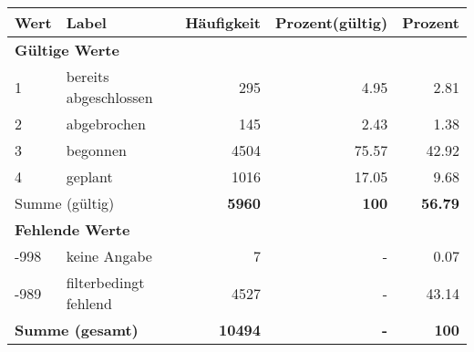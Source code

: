      \begin{longtable}{lXrrr}
     \toprule
     \textbf{Wert} & \textbf{Label} & \textbf{Häufigkeit} & \textbf{Prozent(gültig)} & \textbf{Prozent} \\
     \endhead
     \midrule
     \multicolumn{5}{l}{\textbf{Gültige Werte}}\\

     1 &
     \multicolumn{1}{X}{ bereits abgeschlossen   } &


       \num{295} &
       \num[round-mode=places,round-precision=2]{4,95} &
         \num[round-mode=places,round-precision=2]{2,81} \\

     2 &
     \multicolumn{1}{X}{ abgebrochen   } &


       \num{145} &
       \num[round-mode=places,round-precision=2]{2,43} &
         \num[round-mode=places,round-precision=2]{1,38} \\

     3 &
     \multicolumn{1}{X}{ begonnen   } &


       \num{4504} &
       \num[round-mode=places,round-precision=2]{75,57} &
         \num[round-mode=places,round-precision=2]{42,92} \\

     4 &
     \multicolumn{1}{X}{ geplant   } &


       \num{1016} &
       \num[round-mode=places,round-precision=2]{17,05} &
         \num[round-mode=places,round-precision=2]{9,68} \\
     \midrule
     \multicolumn{2}{l}{Summe (gültig)} &
       \textbf{\num{5960}} &
     \textbf{100} &
       \textbf{\num[round-mode=places,round-precision=2]{56,79}} \\
     \multicolumn{5}{l}{\textbf{Fehlende Werte}}\\
       -998 &
       keine Angabe &
         \num{7} &
        - &
         \num[round-mode=places,round-precision=2]{0,07} \\
       -989 &
       filterbedingt fehlend &
         \num{4527} &
        - &
         \num[round-mode=places,round-precision=2]{43,14} \\
     \midrule
     \multicolumn{2}{l}{\textbf{Summe (gesamt)}} &
          \textbf{\num{10494}} &
        \textbf{-} &
        \textbf{100} \\
     \bottomrule
     \end{longtable}
     
